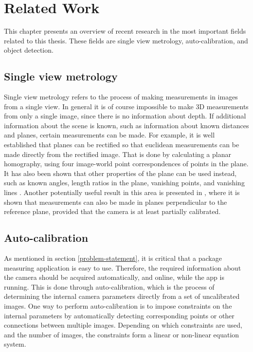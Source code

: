 \chapter{Related Work}
This chapter presents an overview of recent research in the most important fields related to this thesis.
These fields are single view metrology, auto-calibration, and object detection.

\section{Single view metrology} %
Single view metrology refers to the process of making measurements in images from a single view.
In general it is of course impossible to make 3D measurements from only a single image, since there is no information about depth.
If additional information about the scene is known, such as information about known distances and planes, certain measurements can be made.
For example, it is well established that planes can be rectified so that euclidean measurements can be made directly from the rectified image.
That is done by calculating a planar homography, using four image-world point correspondences of points in the plane.
It has also been shown that other properties of the plane can be used instead, such as known angles, length ratios in the plane, vanishing points, and vanishing lines \cite{liebowitz1998metric} \cite{criminisi2000single}.
Another potentially useful result in this area is presented in \cite{huang2004new}, where it is shown that measurements can also be made in planes perpendicular to the reference plane, provided that the camera is at least partially calibrated.

\section{Auto-calibration}
As mentioned in section \ref{problem-statement}, it is critical that a package measuring application is easy to use.
Therefore, the required information about the camera should be acquired automatically, and online, while the app is running.
This is done through auto-calibration, which is the process of determining the internal camera parameters directly from a set of uncalibrated images.
One way to perform auto-calibration is to impose constraints on the internal parameters by automatically detecting corresponding points or other connections between multiple images. 
Depending on which constraints are used, and the number of images, the constraints form a linear or non-linear equation system. \cite[458-469]{hartley-zisserman}


